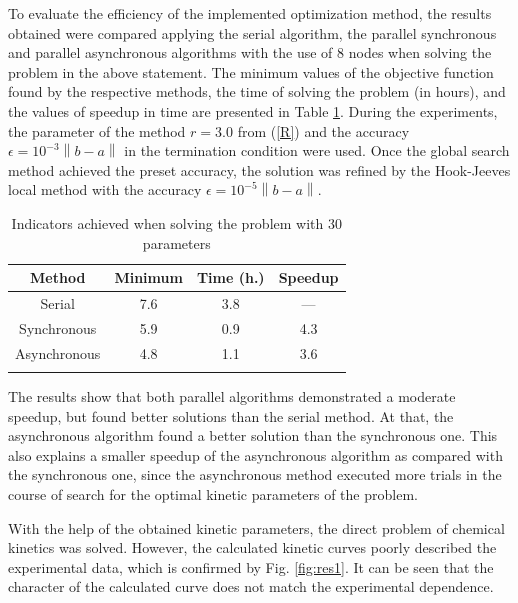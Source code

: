 \documentclass{svproc}
\begin{document}
To evaluate the efficiency of the implemented optimization method, the results obtained  were compared applying the serial algorithm, the parallel synchronous and parallel asynchronous algorithms with the use of 8 nodes when solving the problem in the above statement.  
The minimum values of the objective function found by the respective methods, the time of solving the problem (in hours), and the values of speedup in time are presented in Table \ref{table_30D}. 
During the experiments, the parameter of the method $r=3.0$ from (\ref{R}) and the accuracy  $\epsilon = 10^{-3}\left\|b-a\right\|$ in the termination condition were used. Once the global search method achieved the preset accuracy, the solution was refined by the Hook-Jeeves local method \cite{HookJeeves} with the accuracy $\epsilon = 10^{-5}\left\|b-a\right\|$.

\begin{table}
\caption{Indicators achieved when solving the problem with 30 parameters}
\label{table_30D}
\begin{center}
\begin{tabular}{cccc}
\hline\noalign{\smallskip}
 Method      & Minimum  & Time (h.) & Speedup \\
\hline\noalign{\smallskip}
Serial       & 7.6   &    3.8     &  ---        \\
Synchronous  & 5.9   &   0.9     &   4.3       \\
Asynchronous & 4.8   &   1.1     &   3.6       \\
\noalign{\smallskip}\hline
\end{tabular}\end{center}\end{table}

The results show that both parallel algorithms demonstrated a moderate speedup, but found better solutions than the serial method. At that, the asynchronous algorithm found a better solution than the synchronous one. This also explains a smaller speedup of the asynchronous algorithm as compared with the synchronous one, since the asynchronous method executed more trials in the course of search for the optimal kinetic parameters of the problem.

With the help of the obtained kinetic parameters, the direct problem of chemical kinetics was solved. However, the calculated kinetic curves poorly described the experimental data, which is confirmed by Fig. \ref{fig:res1}. It can be seen that the character of the calculated curve does not match the experimental dependence.
\end{document}
